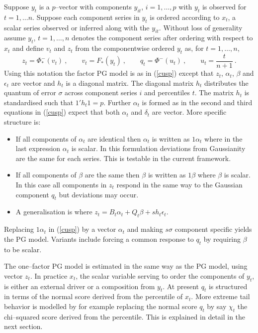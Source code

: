 \documentclass[authoryear]{elsarticle}
\newcommand{\eps}{\epsilon}
\newcommand{\eref}[1]{(\ref{#1})}
\newcommand{\cq}{\ , \qquad}
\begin{document}
Suppose $y_t$ is a $p$--vector with components $y_{it}$, $i=1,\ldots,p$ with $y_t$ is observed for $t=1,\ldots n$.   Suppose each component series in $y_t$ is ordered according to $x_t$, a scalar series observed or inferred along with the $y_{it}$.   Without loss of generality assume $y_t$, $t=1,\ldots,n$ denotes the component series after ordering with respect to $x_t$ and define $v_t$ and $z_t$ from the componentwise ordered $y_t$ as, for $t=1,\ldots,n$, 
$$
z_t = \Phi^-_*(v_t)\cq v_t = F_*(y_t)\cq q_t=\Phi^-(u_t)\cq u_t=\frac{t}{n+1}\ .
$$
Using this notation the factor PG model is as in \eref{cusp} except that $z_t$, $\alpha_t$, $\beta$ and $\eps_t$ are vector and $h_t$ is a diagonal matrix. The diagonal matrix $h_t$ distributes the quantum of error $\sigma$  across component series $i$ and percentiles $t$.   The matrix $h_t$ is standardised such that $1'h_t1=p$.    Further $\alpha_t$ is formed as in the second and third equations in \eref{cusp} expect that both $\alpha_t$ and $\delta_t$ are vector.    More specific structure is: 
\begin{itemize}
\item   If all components of $\alpha_t$ are identical then  $\alpha_t$ is written as $1\alpha_t$ where in the last expression $\alpha_t$ is scalar.  In this formulation deviations from Gaussianity are the same for each series.  This is testable in the current framework.
\item If all components of $\beta$ are the same then  $\beta$ is written as $1\beta$ where $\beta$ is scalar.   In this case all components in $z_t$ respond in the same way to the Gaussian component $q_t$ but deviations may occur.  
\item A generalisation is where $z_t=B_t\alpha_t + Q_t\beta + sh_t\eps_t$.

\end{itemize}


Replacing $1\alpha_t$ in \eref{cusp} by a vector  $\alpha_t$ and making $s\sigma$ component specific  yields the PG model.  Variants include forcing  a common response to $q_t$ by requiring  $\beta$ to be scalar. 

The one--factor PG model is estimated in the same way as the PG model, using vector $z_t$.   In practice $x_t$, the scalar variable serving to order the components of $y_t$, is either an external driver or a composition from $y_t$.   At present $q_t$ is structured in terms of the normal score derived from the percentile of $x_t$.   More extreme tail behavior is modelled by  for example replacing the normal score $q_t$ by say $\chi_t$ the chi--squared score derived from the percentile.   This is explained in detail in the next section.
\end{document}
